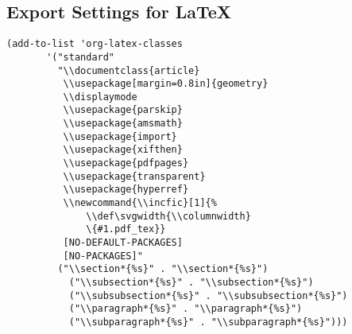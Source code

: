 \subsection{Export Settings for \LaTeX{}}
\label{sec:org434bec6}
\begin{verbatim}
(add-to-list 'org-latex-classes
	   '("standard"
		 "\\documentclass{article}
		  \\usepackage[margin=0.8in]{geometry}
		  \\displaymode
		  \\usepackage{parskip}
		  \\usepackage{amsmath} 
		  \\usepackage{import}
		  \\usepackage{xifthen}
		  \\usepackage{pdfpages}
		  \\usepackage{transparent}
		  \\usepackage{hyperref}
		  \\newcommand{\\incfic}[1]{%
		      \\def\svgwidth{\\columnwidth}
		      \{#1.pdf_tex}}
		  [NO-DEFAULT-PACKAGES]
		  [NO-PACKAGES]"
		 ("\\section*{%s}" . "\\section*{%s}")
	       ("\\subsection*{%s}" . "\\subsection*{%s}")
	       ("\\subsubsection*{%s}" . "\\subsubsection*{%s}")
	       ("\\paragraph*{%s}" . "\\paragraph*{%s}")
	       ("\\subparagraph*{%s}" . "\\subparagraph*{%s}")))
\end{verbatim}

